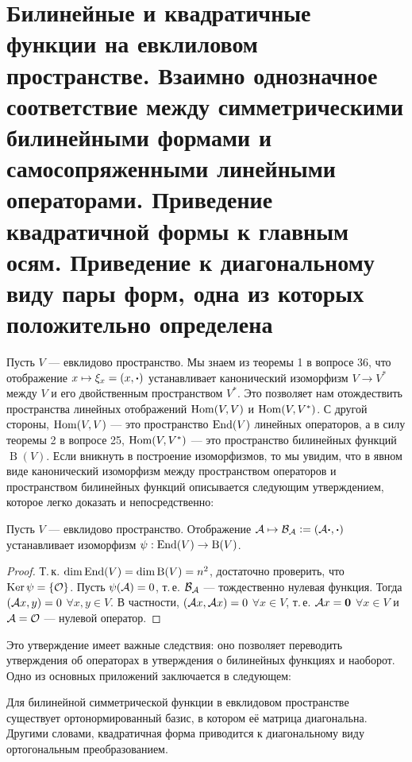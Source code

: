 \section{Билинейные и квадратичные функции на евклиловом пространстве. Взаимно однозначное
соответствие между симметрическими билинейными формами и самосопряженными
линейными операторами. Приведение квадратичной формы к главным осям. Приведение к
диагональному виду пары форм, одна из которых положительно определена}

Пусть $V$ --- евклидово пространство. Мы знаем из теоремы 1 в вопросе 36, что отображение $x \mapsto \xi_x = (x, \boldsymbol{\cdot})$ устанавливает канонический изоморфизм $V \to V^\ast$ между $V$ и его двойственным пространством $V^\ast$. Это позволяет нам отождествить пространства линейных отображений $\operatorname{Hom}(V, V)$ и $\operatorname{Hom}(V, V^\ast)$. С другой стороны, $\operatorname{Hom}(V ,V)$ --- это пространство $\operatorname{End}(V)$ линейных операторов, а в силу теоремы 2 в вопросе 25, $\operatorname{Hom}(V, V^\ast)$ --- это пространство билинейных функций $\operatorname{B}(V)$. Если вникнуть в построение изоморфизмов, то мы увидим, что в явном виде канонический изоморфизм между пространством операторов и пространством билинейных функций описывается следующим утверждением, которое легко доказать и непосредственно:

\begin{proposal}
    Пусть $V$ --- евклидово пространство. Отображение $\mathcal{A} \mapsto \mathcal{B}_{\mathcal{A}} \vcentcolon = (\mathcal{A}\boldsymbol{\cdot}, \boldsymbol{\cdot})$ устанавливает изоморфизм $\psi: \operatorname{End}(V) \to \operatorname{B}(V)$.
\end{proposal}

\begin{proof}
    Т.\,к. $\dim\operatorname{End}(V) = \dim\operatorname{B}(V) = n^2$, достаточно проверить, что $\operatorname{Ker}\psi = \{\mathcal{O}\}$. Пусть $\psi(\mathcal{A}) = 0$, т.\,е. $\mathcal{B}_{\mathcal{A}}$ --- тождественно нулевая функция. Тогда $(\mathcal{A} x, y) = 0$ $\forall x, y \in V$. В частности, $(\mathcal{A} x, \mathcal{A} x) = 0$ $\forall x \in V$, т.\,е. $\mathcal{A} x = \boldsymbol{0}$ $\forall x \in V$ и $\mathcal{A} = \mathcal{O}$ --- нулевой оператор.
\end{proof}

Это утверждение имеет важные следствия: оно позволяет переводить утверждения об операторах в утверждения о билинейных функциях и наоборот. Одно из основных приложений заключается в следующем:

\begin{theorem}
    Для билинейной симметрической функции в евклидовом пространстве существует ортонормированный базис, в котором её матрица диагональна. Другими словами, квадратичная форма приводится к диагональному виду ортогональным преобразованием.
\end{theorem}

